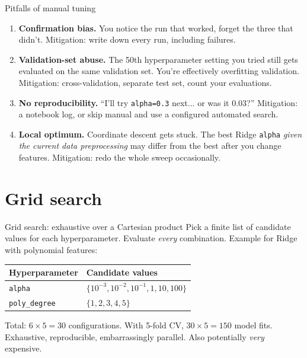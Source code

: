 \documentclass[aspectratio=169]{beamer}
\begin{document}
\begin{frame}{Pitfalls of manual tuning}
  \begin{enumerate}
    \item \textbf{Confirmation bias.} You notice the run that worked, forget the three that didn't. Mitigation: write down every run, including failures.
    \item \textbf{Validation-set abuse.} The 50th hyperparameter setting you tried still gets evaluated on the same validation set. You're effectively overfitting validation. Mitigation: cross-validation, separate test set, count your evaluations.
    \item \textbf{No reproducibility.} ``I'll try \texttt{alpha=0.3} next... or was it 0.03?'' Mitigation: a notebook log, or skip manual and use a configured automated search.
    \item \textbf{Local optimum.} Coordinate descent gets stuck. The best Ridge \texttt{alpha} \emph{given the current data preprocessing} may differ from the best after you change features. Mitigation: redo the whole sweep occasionally.
  \end{enumerate}
\end{frame}

\section{Grid search}

\begin{frame}{Grid search: exhaustive over a Cartesian product}
  Pick a finite list of candidate values for each hyperparameter. Evaluate \emph{every} combination.
  \vfill
  Example for Ridge with polynomial features:
  \begin{center}\small
    \begin{tabular}{ll}
      Hyperparameter & Candidate values \\
      \hline
      \texttt{alpha} & $\{10^{-3}, 10^{-2}, 10^{-1}, 1, 10, 100\}$ \\
      \texttt{poly\_degree} & $\{1, 2, 3, 4, 5\}$ \\
    \end{tabular}
  \end{center}
  \vfill
  Total: $6 \times 5 = 30$ configurations. With 5-fold CV, $30 \times 5 = 150$ model fits.
  \vfill
  Exhaustive, reproducible, embarrassingly parallel. Also potentially \emph{very} expensive.
\end{frame}
\end{document}
